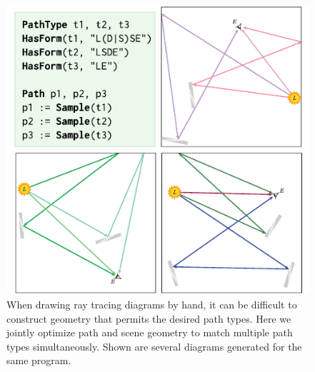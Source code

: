 \begin{figure}

   \centering
   \includegraphics[scale=1.5]{assets/penrose/rt-multiple-paths.pdf}
   \caption{When drawing ray tracing diagrams by hand, it can be difficult to construct geometry that permits the desired path types.  Here we jointly optimize path and scene geometry to match multiple path types simultaneously.  Shown are several diagrams generated for the same program.\label{fig:rt-multiple-paths}}
\end{figure}



